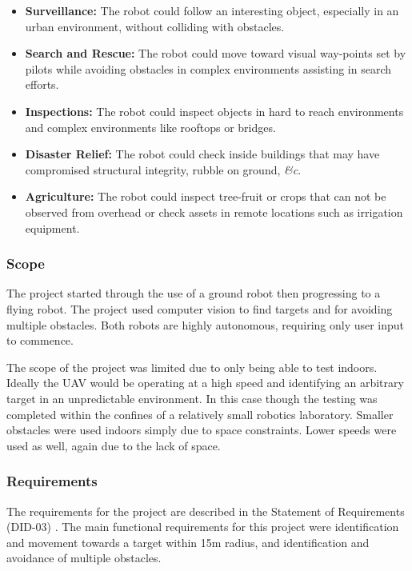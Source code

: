 \documentclass{article}[12]
\begin{document}
		\begin{itemize}
			\item \textbf{Surveillance:} The robot could follow an interesting object, especially in an urban environment, without colliding with obstacles.
			\item \textbf{Search and Rescue:} The robot could move toward visual way-points set by pilots while avoiding obstacles in complex environments assisting in search efforts.
			\item \textbf{Inspections:} The robot could inspect objects in hard to reach environments and complex environments like rooftops or bridges.
			\item \textbf{Disaster Relief:} The robot could check inside buildings that may have compromised structural integrity, rubble on ground, \textit{\&c}.
			\item \textbf{Agriculture:} The robot could inspect tree-fruit or crops that can not be observed from overhead or check assets in remote locations such as irrigation equipment.
		\end{itemize}

		\subsubsection{Scope}
	
		The project started through the use of a ground robot then progressing to a flying robot. The project used computer vision to find targets and for avoiding multiple obstacles. Both robots are highly autonomous, requiring only user input to commence. 

		The scope of the project was limited due to only being able to test indoors. Ideally the UAV would be operating at a high speed and identifying an arbitrary target in an unpredictable environment. In this case though the testing was completed within the confines of a relatively small robotics laboratory. Smaller obstacles were used indoors simply due to space constraints. Lower speeds were used as well, again due to the lack of space. 


		\subsubsection{Requirements}
		
		The requirements for the project are described in the Statement of Requirements (DID-03) \cite{sor}. The main functional requirements for this project were identification and movement towards a target within 15m radius, and identification and avoidance of multiple obstacles. 
	
\end{document}
